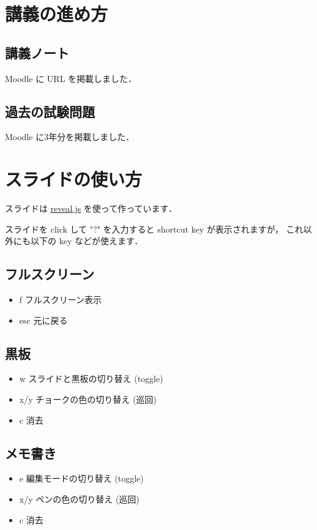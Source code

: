 \documentclass[11pt]{article}
\begin{document}
\section{講義の進め方}
\label{sec:orgee3eceb}
\subsection{講義ノート}
\label{sec:orgddffaa8}
Moodle に URL を掲載しました．

\subsection{過去の試験問題}
\label{sec:org995d9e2}
Moodle に3年分を掲載しました．

\section{スライドの使い方}
\label{sec:orgdcbf98c}
スライドは
\href{https://revealjs.com}{reveal.js}
を使って作っています．

スライドを click して "?" を入力すると
shortcut key が表示されますが，
これ以外にも以下の key などが使えます．

\subsection{フルスクリーン}
\label{sec:org911a883}
\begin{itemize}
\item f フルスクリーン表示
\item esc 元に戻る
\end{itemize}
\subsection{黒板}
\label{sec:orgde7fdc5}
\begin{itemize}
\item w スライドと黒板の切り替え (toggle)
\item x/y チョークの色の切り替え (巡回)
\item c 消去
\end{itemize}
\subsection{メモ書き}
\label{sec:org2fa8275}
\begin{itemize}
\item e 編集モードの切り替え (toggle)
\item x/y ペンの色の切り替え (巡回)
\item c 消去
\end{itemize}
\end{document}
